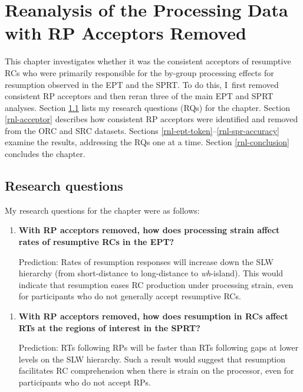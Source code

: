 
\chapter{Reanalysis of the Processing Data with RP Acceptors Removed}\label{ch-reanalysis}

This chapter investigates whether it was the consistent acceptors of resumptive RCs who were primarily responsible for the by-group processing effects for resumption observed in the EPT and the SPRT. To do this, I~first removed consistent RP acceptors and then reran three of the main EPT and SPRT analyses. Section \ref{rnl-rq} lists my research questions (RQs) for the chapter. Section \ref{rnl-acceptor} describes how consistent RP acceptors were identified and removed from the ORC and SRC datasets. Sections \ref{rnl-ept-token}--\ref{rnl-spr-accuracy} examine the results, addressing the RQs one at a time. Section \ref{rnl-conclusion} concludes the chapter.

\section{Research questions}\label{rnl-rq}

My research questions for the chapter were as follows:

\begin{enumerate}[\bfseries RQ1:,itemsep=5pt]
\item {\bfseries With RP acceptors removed, how does processing strain affect rates of resumptive RCs in the EPT?}\par\nobreak
Prediction: Rates of resumption responses will increase down the SLW hierarchy (from short-distance to long-distance to \textit{wh}-island). This would indicate that resumption eases RC production under processing strain, even for participants who do not generally accept resumptive RCs.
\end{enumerate}\vspace{5pt}

\begin{enumerate}[\bfseries RQ2:,itemsep=5pt]
\item {\bfseries With RP acceptors removed, how does resumption in RCs affect RTs at the regions of interest in the SPRT?}\par\nobreak
Prediction: RTs following RPs will be faster than RTs following gaps at lower levels on the SLW hierarchy. Such a result would suggest that resumption facilitates RC comprehension when there is strain on the processor, even for participants who do not accept RPs.
\end{enumerate}\vspace{5pt}

